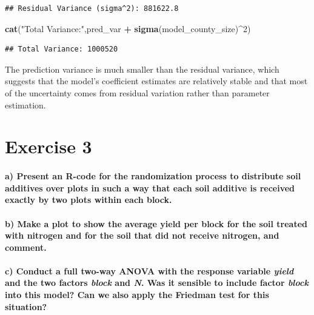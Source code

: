 \documentclass[
  11pt,
]{article}
\newenvironment{Shaded}{\begin{snugshade}}{\end{snugshade}}
\newcommand{\DecValTok}[1]{\textcolor[rgb]{0.00,0.00,0.81}{#1}}
\newcommand{\FunctionTok}[1]{\textcolor[rgb]{0.13,0.29,0.53}{\textbf{#1}}}
\newcommand{\NormalTok}[1]{#1}
\newcommand{\SpecialCharTok}[1]{\textcolor[rgb]{0.81,0.36,0.00}{\textbf{#1}}}
\newcommand{\StringTok}[1]{\textcolor[rgb]{0.31,0.60,0.02}{#1}}
\begin{document}
\begin{verbatim}
## Residual Variance (sigma^2): 881622.8
\end{verbatim}

\begin{Shaded}
\begin{Highlighting}[]
\FunctionTok{cat}\NormalTok{(}\StringTok{"Total Variance:"}\NormalTok{,pred\_var }\SpecialCharTok{+} \FunctionTok{sigma}\NormalTok{(model\_county\_size)}\SpecialCharTok{\^{}}\DecValTok{2}\NormalTok{)}
\end{Highlighting}
\end{Shaded}

\begin{verbatim}
## Total Variance: 1000520
\end{verbatim}

The prediction variance is much smaller than the residual variance,
which suggests that the model's coefficient estimates are relatively
stable and that most of the uncertainty comes from residual variation
rather than parameter estimation.

\section{Exercise 3}\label{exercise-3}

\paragraph{a) Present an R-code for the randomization process to
distribute soil additives over plots in such a way that each soil
additive is received exactly by two plots within each
block.}\label{a-present-an-r-code-for-the-randomization-process-to-distribute-soil-additives-over-plots-in-such-a-way-that-each-soil-additive-is-received-exactly-by-two-plots-within-each-block.}

\paragraph{b) Make a plot to show the average yield per block for the
soil treated with nitrogen and for the soil that did not receive
nitrogen, and
comment.}\label{b-make-a-plot-to-show-the-average-yield-per-block-for-the-soil-treated-with-nitrogen-and-for-the-soil-that-did-not-receive-nitrogen-and-comment.}

\paragraph{\texorpdfstring{c) Conduct a full two-way ANOVA with the
response variable \emph{yield} and the two factors \emph{block} and
\emph{N}. Was it sensible to include factor \emph{block} into this
model? Can we also apply the Friedman test for this
situation?}{c) Conduct a full two-way ANOVA with the response variable yield and the two factors block and N. Was it sensible to include factor block into this model? Can we also apply the Friedman test for this situation?}}\label{c-conduct-a-full-two-way-anova-with-the-response-variable-yield-and-the-two-factors-block-and-n.-was-it-sensible-to-include-factor-block-into-this-model-can-we-also-apply-the-friedman-test-for-this-situation}
\end{document}
